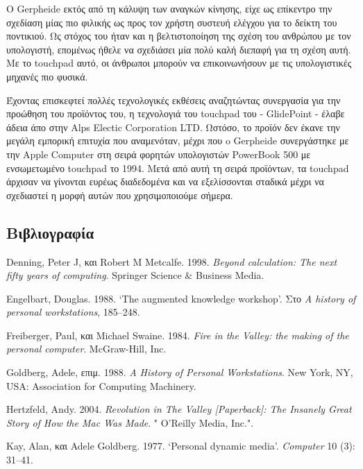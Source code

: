\documentclass[
]{article}
\newlength{\cslhangindent}
\newlength{\cslentryspacingunit} %
\newenvironment{CSLReferences}[2] %
 {%
  \setlength{\parindent}{0pt}
  \ifodd #1
  \let\oldpar\par
  \def\par{\hangindent=\cslhangindent\oldpar}
  \fi
  \setlength{\parskip}{#2\cslentryspacingunit}
 }%
 {}
\begin{document}
Ο Gerpheide εκτός από τη κάλυψη των αναγκών κίνησης, είχε ως επίκεντρο
την σχεδίαση μίας πιο φιλικής ως προς τον χρήστη συστευή ελέγχου για το
δείκτη του ποντικιού. Ως στόχος του ήταν και η βελτιστοποίηση της σχέση
του ανθρώπου με τον υπολογιστή, επομένως ήθελε να σχεδιάσει μία πολύ
καλή διεπαφή για τη σχέση αυτή. Με το touchpad αυτό, οι άνθρωποι μπορούν
να επικοινωνήσουν με τις υπολογιστικές μηχανές πιο φυσικά.

Έχοντας επισκεφτεί πολλές τεχνολογικές εκθέσεις αναζητώντας συνεργασία
για την προώθηση του προϊόντος του, η τεχνολογιά του touchpad του -
GlidePoint - έλαβε άδεια άπο στην Alps Electic Corporation LTD. Ωστόσο,
το προϊόν δεν έκανε την μεγάλη εμπορική επιτυχία που αναμενόταν, μέχρι
που o Gerpheide συνεργάστηκε με την Apple Computer στη σειρά φορητών
υπολογιστών PowerBook 500 με ενσωμετωμένο touchpad το 1994. Μετά από
αυτή τη σειρά προϊόντων, τα touchpad άρχισαν να γίνονται ευρέως
διαδεδομένα και να εξελίσσονται σταδικά μέχρι να σχεδιαστεί η μορφή
αυτών που χρησιμοποιούμε σήμερα.

\hypertarget{ux3b2ux3b9ux3b2ux3bbux3b9ux3bfux3b3ux3c1ux3b1ux3c6ux3afux3b1}{%
\subsection*{Βιβλιογραφία}\label{ux3b2ux3b9ux3b2ux3bbux3b9ux3bfux3b3ux3c1ux3b1ux3c6ux3afux3b1}}

\hypertarget{refs}{}
\begin{CSLReferences}{0}{0}
\end{CSLReferences}

Denning, Peter J, και Robert M Metcalfe. 1998. \emph{Beyond calculation:
The next fifty years of computing}. Springer Science \& Business Media.

Engelbart, Douglas. 1988. {`The augmented knowledge workshop'}. Στο
\emph{A history of personal workstations}, 185--248.

Freiberger, Paul, και Michael Swaine. 1984. \emph{Fire in the Valley:
the making of the personal computer}. McGraw-Hill, Inc.

Goldberg, Adele, επιμ. 1988. \emph{A History of Personal Workstations}.
New York, NY, USA: Association for Computing Machinery.

Hertzfeld, Andy. 2004. \emph{Revolution in The Valley
{{[}}Paperback{{]}}: The Insanely Great Story of How the Mac Was Made}.
" O'Reilly Media, Inc.".

Kay, Alan, και Adele Goldberg. 1977. {`Personal dynamic media'}.
\emph{Computer} 10 (3): 31--41.
\end{document}
